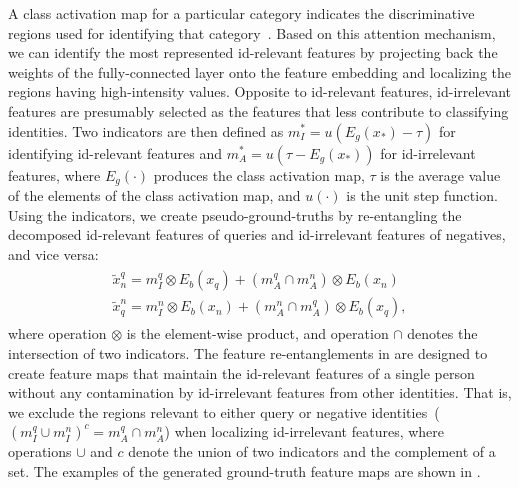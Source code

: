 A class activation map for a particular category indicates the discriminative regions used for identifying that category~\cite{zhou2016learning}. Based on this attention mechanism, we can identify the most represented id-relevant features by projecting back the weights of the fully-connected layer onto the feature embedding and localizing the regions having high-intensity values. Opposite to id-relevant features, id-irrelevant features are presumably selected as the features that less contribute to classifying identities. Two indicators are then defined as $m_{\scriptscriptstyle I}^{*} = u\left( E_{g}( x_{\scriptscriptstyle *} )- \tau \right)$ for identifying id-relevant features and $m_{\scriptscriptstyle A}^{*} = u\left( \tau - E_{g}( x_{\scriptscriptstyle *} ) \right)$ for id-irrelevant features, where $E_{g}(\cdot)$ produces the class activation map, $\tau$ is the average value of the elements of the class activation map, and $u(\cdot)$ is the unit step function. Using the indicators, we create pseudo-ground-truths by re-entangling the decomposed id-relevant features of queries and id-irrelevant features of negatives, and vice versa:
\begin{align} \label{eq:pseudo_ground_truth}
\begin{array}{l}
    \widetilde{x}_{\scriptscriptstyle n}^{\scriptscriptstyle q} = m_{\scriptscriptstyle I}^{q} \otimes E_{b}( x_{\scriptscriptstyle q}) + \left(m_{\scriptscriptstyle A}^{q} \cap m_{\scriptscriptstyle A}^{n}\right) \otimes E_{b}( x_{\scriptscriptstyle n}) \\
    \widetilde{x}_{\scriptscriptstyle q}^{\scriptscriptstyle n} = m_{\scriptscriptstyle I}^{n} \otimes E_{b}( x_{\scriptscriptstyle n}) + \left(m_{\scriptscriptstyle A}^{n} \cap m_{\scriptscriptstyle A}^{q}\right) \otimes E_{b}( x_{\scriptscriptstyle q}),
\end{array}\end{align}
where operation $\otimes$ is the element-wise product, and operation $\cap$ denotes the intersection of two indicators. The feature re-entanglements in  are designed to create feature maps that maintain the id-relevant features of a single person without any contamination by id-irrelevant features from other identities. That is, we exclude the regions relevant to either query or negative identities~(\ie $\left(m_{\scriptscriptstyle I}^{q} \cup m_{\scriptscriptstyle I}^{n}\right)^{c} = m_{\scriptscriptstyle A}^{q} \cap m_{\scriptscriptstyle A}^{n}$) when localizing id-irrelevant features, where operations $\cup$ and $c$ denote the union of two indicators and the complement of a set. The examples of the generated ground-truth feature maps are shown in . 


